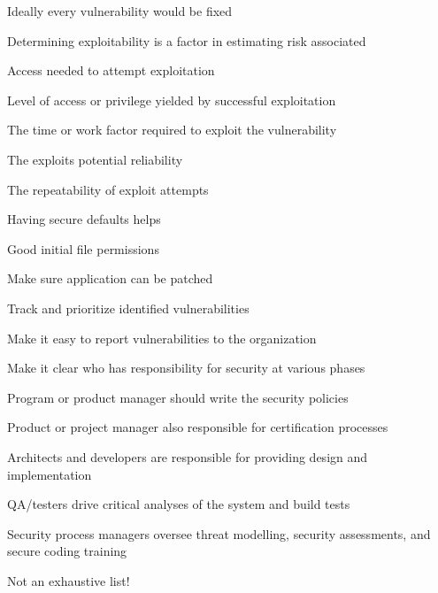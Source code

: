\documentclass[Screen16to9,17pt]{foils}
\begin{document}


\begin{list1}
\item Ideally every vulnerability would be fixed
\item Determining exploitability is a factor in estimating risk associated
\begin{list2}
\item Access needed to attempt exploitation
\item Level of access or privilege yielded by successful exploitation
\item The time or work factor required to exploit the vulnerability
\item The exploits potential reliability
\item The repeatability of exploit attempts
\end{list2}
\end{list1}



\begin{list2}
\item Having secure defaults helps
\item Good initial file permissions
\item Make sure application can be patched
\item Track and prioritize identified vulnerabilities
\item Make it easy to report vulnerabilities to the organization
\end{list2}


\begin{list2}
\item Make it clear who has responsibility for security at various phases
\item Program or product manager should write the security policies
\item Product or project manager also responsible for certification processes
\item Architects and developers are responsible for providing design and implementation
\item QA/testers drive critical analyses of the system and build tests
\item Security process managers oversee threat modelling, security assessments, and secure coding training
\vskip 1cm
\item Not an exhaustive list!
\end{list2}
\end{document}
